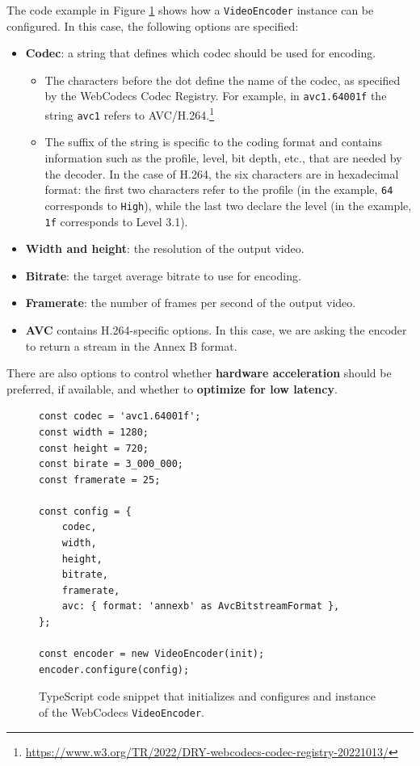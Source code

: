 The code example in Figure \ref{fig:webcodecs_videoencoder} shows how a \texttt{VideoEncoder} instance can be configured. In this case, the following options are specified:

\begin{itemize}
    \item \textbf{Codec}: a string that defines which codec should be used for encoding.
    \begin{itemize}
        \item The characters before the dot define the name of the codec, as specified by the WebCodecs Codec Registry. For example, in \texttt{avc1.64001f} the string \texttt{avc1} refers to AVC/H.264.\footnote{\url{https://www.w3.org/TR/2022/DRY-webcodecs-codec-registry-20221013/}}
        \item The suffix of the string is specific to the coding format and contains information such as the profile, level, bit depth, etc., that are needed by the decoder. In the case of H.264, the six characters are in hexadecimal format: the first two characters refer to the profile (in the example, \texttt{64} corresponds to \texttt{High}), while the last two declare the level (in the example, \texttt{1f} corresponds to Level 3.1).
    \end{itemize}
    \item \textbf{Width and height}: the resolution of the output video.
    \item \textbf{Bitrate}: the target average bitrate to use for encoding.
    \item \textbf{Framerate}: the number of frames per second of the output video.
    \item \textbf{AVC} contains H.264-specific options. In this case, we are asking the encoder to return a stream in the Annex B format.
\end{itemize}

There are also options to control whether \textbf{hardware acceleration} should be preferred, if available, and whether to \textbf{optimize for low latency}.

\begin{figure}
    \centering
    \begin{verbatim}
const codec = 'avc1.64001f';
const width = 1280;
const height = 720;
const birate = 3_000_000;
const framerate = 25;

const config = {
    codec,
    width,
    height,
    bitrate,
    framerate,
    avc: { format: 'annexb' as AvcBitstreamFormat },
};

const encoder = new VideoEncoder(init);
encoder.configure(config);
\end{verbatim}
    \caption{TypeScript code snippet that initializes and configures and instance of the WebCodecs \texttt{VideoEncoder}.}
    \label{fig:webcodecs_videoencoder}
\end{figure}

